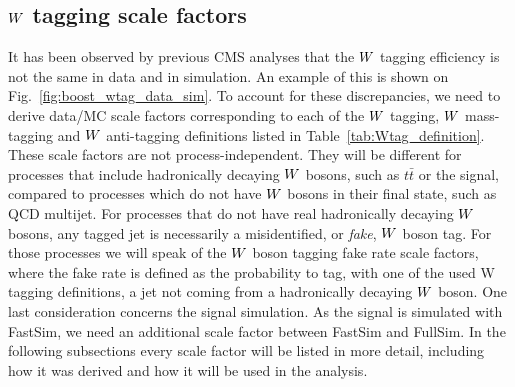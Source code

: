 \subsection{\texorpdfstring{$W$}{W} tagging scale factors \label{sec:wtag_scale_factor}}

It has been observed by previous CMS analyses that the $W$ tagging efficiency is not the same in
data and in simulation. An example of this is shown on Fig.~\ref{fig:boost_wtag_data_sim}. 
To account for these discrepancies, we need to derive data/MC scale factors corresponding to each
of the $W$ tagging, $W$ mass-tagging and $W$ anti-tagging definitions listed in
Table~\ref{tab:Wtag_definition}. These scale factors are not process-independent. They will be
different for processes that include hadronically decaying $W$ bosons, such as $t\bar{t}$ or the
signal, compared to processes which do not have $W$ bosons in their final state, such as QCD
multijet. For processes that do not have real hadronically decaying $W$ bosons, any tagged jet is
necessarily a misidentified, or \textit{fake}, $W$ boson tag. For those processes we will speak of
the $W$ boson tagging fake rate scale factors, where the fake rate is defined as the probability to
tag, with one of the used W tagging definitions, a jet not coming from a hadronically decaying $W$
boson. 
One last consideration concerns the signal simulation. As the signal is simulated with FastSim, we
need an additional scale factor between FastSim and FullSim. 
In the following subsections every scale factor will be listed in more detail, including how it was
derived and how it will be used in the analysis. 


